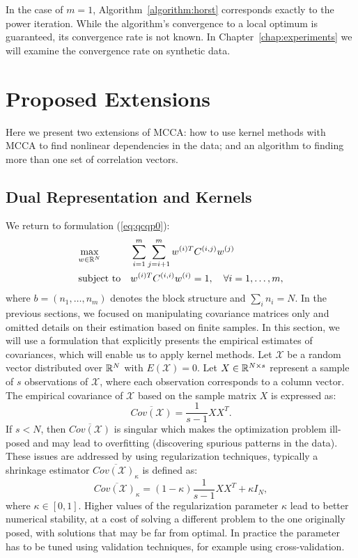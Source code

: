 In the case of $m=1$, Algorithm~\ref{algorithm:horst}
corresponds exactly to the power iteration. While the algorithm's
convergence to a local optimum is guaranteed, its convergence rate is not known. In
Chapter~\ref{chap:experiments} we will examine the convergence
rate on synthetic data.

\section{Proposed Extensions}

Here we present two extensions of MCCA: how to use kernel methods with
MCCA to find nonlinear dependencies in the data; and an
algorithm to finding more than one set of correlation vectors.
\subsection{Dual Representation and Kernels}\label{chap:extensions:kernels}

We return to formulation (\ref{eq:qcqp0}):
\begin{equation*}
\begin{aligned}
& \underset{w \in \mathbb{R}^N}{\text{max}}
& & \sum_{i = 1}^m \sum_{j = i+1 }^m w^{(i)T} C^{(i,j)} w^{(j)}\\
& \text{subject to}
& &w^{(i)T} C^{(i,i)} w^{(i)} = 1, \quad\forall i = 1,\ldots, m,
\end{aligned}
\end{equation*}
where $b = \left(n_1,\ldots,n_m\right)$ denotes the block structure
and $ \sum_i n_i = N $.
In the previous sections, we focused on manipulating covariance matrices
only and omitted details on their estimation based on finite samples.
In this section, we will use a formulation that explicitly presents
the empirical estimates of covariances, which will enable us to apply kernel methods.
Let $\mathcal{X}$ be a random vector distributed over $\mathbb{R}^N$ with
$E\left(\mathcal{X}\right) = 0$. Let $X \in \mathbb{R}^{N \times s}$
represent a sample of $s$ observations of $\mathcal{X}$, where each
observation corresponds to a column vector. The empirical covariance of $\mathcal{X}$
based on the sample matrix $X$ is expressed as:
$$ \overline{Cov\left(\mathcal{X}\right)} = \frac{1}{s - 1}X X^T.$$
If $s < N$, then $\overline{Cov\left(\mathcal{X}\right)}$ is singular which
makes the optimization problem ill-posed and may lead to overfitting
(discovering spurious patterns in the data). These issues are addressed by
using regularization techniques, typically a shrinkage estimator
$\overline{Cov\left(\mathcal{X}\right)_{\kappa}}$ is defined as:
$$ \overline{Cov\left(\mathcal{X}\right)_{\kappa}} = \left(1-\kappa\right)
 \frac{1}{s - 1}X X^T + \kappa  I_N,$$ where $\kappa \in \left[0,1\right]$.
Higher values of the regularization parameter $\kappa$ lead to better numerical stability,
at a cost of solving a different problem to the one originally posed, with solutions
that may be far from optimal. In practice the parameter has to be tuned using validation
techniques, for example using cross-validation.


